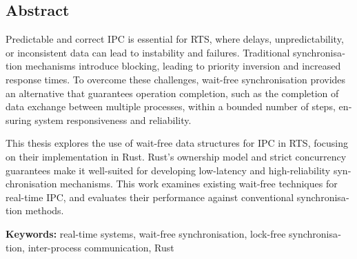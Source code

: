 \begin{otherlanguage}{english}
\chapter*{Abstract}


Predictable and correct \ac{IPC} is essential for \ac{RTS}, where delays, unpredictability, or inconsistent data can lead to instability and failures. Traditional synchronisation mechanisms introduce blocking, leading to priority inversion and increased response times. To overcome these challenges, wait-free synchronisation provides an alternative that guarantees operation completion, such as the completion of data exchange between multiple processes, within a bounded number of steps, ensuring system responsiveness and reliability.

This thesis explores the use of wait-free data structures for \ac{IPC} in \ac{RTS}, focusing on their implementation in Rust. Rust's ownership model and strict concurrency guarantees make it well-suited for developing low-latency and high-reliability synchronisation mechanisms. This work examines existing wait-free techniques for real-time \ac{IPC}, and evaluates their performance against conventional synchronisation methods.

\vfill
\noindent\textbf{Keywords:} real-time systems, wait-free synchronisation, lock-free synchronisation, inter-process communication, Rust
\vfill
\end{otherlanguage}